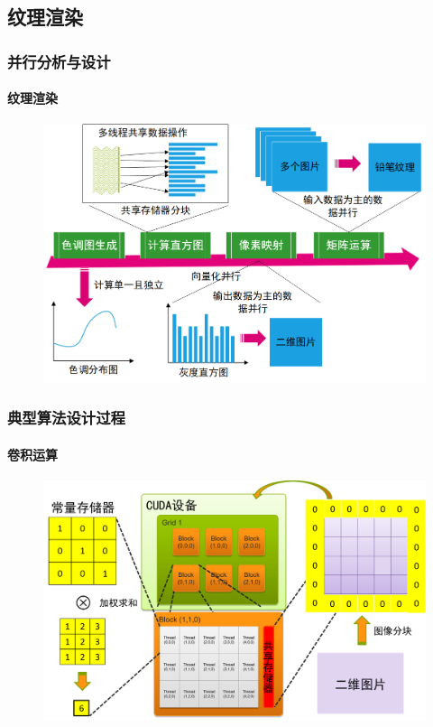 \documentclass[aspectratio=43, xcolor=svgnames, t, 10pt]{beamer}
\begin{document}

\subsection{纹理渲染}
\begin{frame}
  \frametitle{并行分析与设计}
  \framesubtitle{纹理渲染}
  \begin{figure}
    \includegraphics[width=\linewidth]{./figure/texture_render_design.png}
  \end{figure}
\end{frame}

\begin{frame}
  \frametitle{典型算法设计过程}
  \framesubtitle{卷积运算}
  \begin{figure}
    \includegraphics[width=\linewidth]{./figure/convolution_proc.png}
  \end{figure}
\end{frame}
\end{document}
